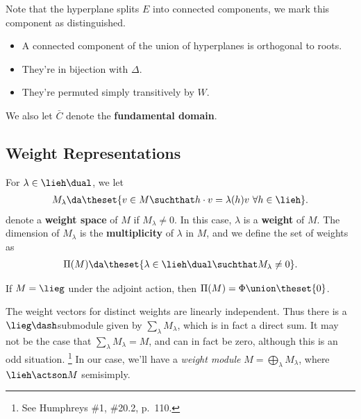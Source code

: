 \begin{remark}

Note that the hyperplane splits \(E\) into connected components, we mark
this component as distinguished.

\begin{itemize}
\tightlist
\item
  A connected component of the union of hyperplanes is orthogonal to
  roots.
\item
  They're in bijection with \(\Delta\).
\item
  They're permuted simply transitively by \(W\).
\end{itemize}

We also let \(\bar C\) denote the \textbf{fundamental domain}.

\end{remark}

\hypertarget{weight-representations}{%
\subsection{Weight Representations}\label{weight-representations}}

\begin{definition}

For \(\lambda \in \lieh\dual\), we let
\begin{align*}  
M_\lambda \da
\theset{v\in M \suchthat h\cdot v = \lambda(h) v ~\forall h\in\lieh}
.\end{align*} denote a \textbf{weight space} of \(M\) if
\(M_\lambda \neq 0\). In this case, \(\lambda\) is a \textbf{weight} of
\(M\). The dimension of \(M_\lambda\) is the \textbf{multiplicity} of
\(\lambda\) in \(M\), and we define the set of weights as
\begin{align*}  
\Pi(M) \da
\theset{\lambda \in \lieh\dual \suchthat M_\lambda \neq 0}
.\end{align*}

\end{definition}

\begin{example}[?]

If \(M = \lieg\) under the adjoint action, then
\(\Pi(M) = \Phi \union \theset{0}\).

\end{example}

\begin{remark}

The weight vectors for distinct weights are linearly independent. Thus
there is a \(\lieg\dash\)submodule given by \(\sum_\lambda M_\lambda\),
which is in fact a direct sum. It may not be the case that
\(\sum_\lambda M_\lambda = M\), and can in fact be zero, although this
is an odd situation. \footnote{See Humphreys \#1, \#20.2, p.~110.} In
our case, we'll have a \emph{weight module}
\(M = \bigoplus_\lambda M_\lambda\), where \(\lieh\actson M\)
semisimply.

\end{remark}

